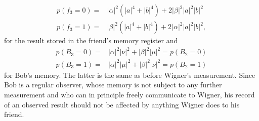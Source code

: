 \documentclass[a4paper,twocolumn,11pt,accepted=2017-05-09,dvipsnames]{quantumarticle}
\numberwithin{equation}{section}
\begin{document}
\begin{appendix}
\begin{align}
\label{ft_1_0}
p(f_3=0)=&|\alpha|^2 (|a|^4+|b|^4)+ 2 |\beta|^2 |a|^2|b|^2   \\
\label{ft1_1}
p(f_3=1)=& |\beta|^2 (|a|^4+|b|^4)+2 |\alpha|^2 |a|^2|b|^2 ,  
\end{align}
for the result stored in the friend's memory register and 
\begin{align}
\label{bt3_0}
p(B_3=0)=& |\alpha|^2 |\nu|^2+|\beta|^2|\mu|^2  =p(B_2=0)\\
\label{bt3_1}
p(B_3=1)=& |\alpha|^2 |\mu|^2+|\beta|^2|\nu|^2  =p(B_2=1)
\end{align}
for Bob's memory. The latter is the same as before Wigner's measurement. Since Bob is a regular observer, whose memory is not subject to any further measurement and who can in principle freely communicate to Wigner, his record of an observed result should not be affected by anything Wigner does to his friend.


\end{appendix}
\end{document}
